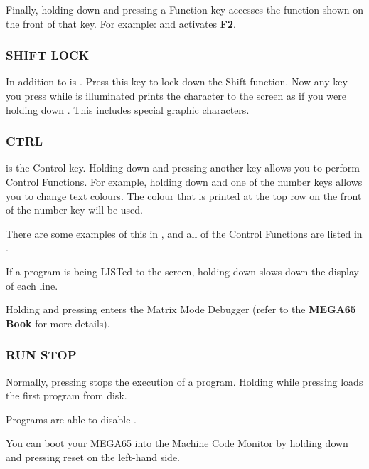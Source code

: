 Finally, holding  down and pressing a Function key accesses the function shown on the front of that key. For example:  and  activates \textbf{F2}.


\subsubsection{SHIFT LOCK}

In addition to  is . Press this key to lock down the Shift function. Now any key you press while  is illuminated prints the character to the screen as if you were holding down . This includes special graphic characters.

\subsubsection{CTRL}

 is the Control key. Holding down  and pressing another key allows you to perform Control Functions. For example, holding down  and one of the number keys allows you to change text colours. The colour that is printed at the top row on the front of the number key will be used.

There are some examples of this in , and all of the Control Functions are listed in .

If a program is being LISTed to the screen, holding down  slows down the display of each line.

Holding  and pressing \megakey{*} enters the Matrix Mode Debugger (refer to the {\bf MEGA65 Book} for more details).

\subsubsection{RUN STOP}

Normally, pressing  stops the execution of a program. Holding  while pressing  loads the first program from disk.

Programs are able to disable .

You can boot your MEGA65 into the Machine Code Monitor by holding down  and pressing reset on the left-hand side.

